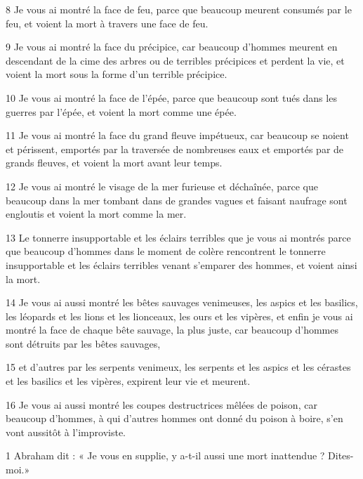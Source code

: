 \par 8 Je vous ai montré la face de feu, parce que beaucoup meurent consumés par le feu, et voient la mort à travers une face de feu.

\par 9 Je vous ai montré la face du précipice, car beaucoup d'hommes meurent en descendant de la cime des arbres ou de terribles précipices et perdent la vie, et voient la mort sous la forme d'un terrible précipice.

\par 10 Je vous ai montré la face de l'épée, parce que beaucoup sont tués dans les guerres par l'épée, et voient la mort comme une épée.

\par 11 Je vous ai montré la face du grand fleuve impétueux, car beaucoup se noient et périssent, emportés par la traversée de nombreuses eaux et emportés par de grands fleuves, et voient la mort avant leur temps.

\par 12 Je vous ai montré le visage de la mer furieuse et déchaînée, parce que beaucoup dans la mer tombant dans de grandes vagues et faisant naufrage sont engloutis et voient la mort comme la mer.

\par 13 Le tonnerre insupportable et les éclairs terribles que je vous ai montrés parce que beaucoup d'hommes dans le moment de colère rencontrent le tonnerre insupportable et les éclairs terribles venant s'emparer des hommes, et voient ainsi la mort.

\par 14 Je vous ai aussi montré les bêtes sauvages venimeuses, les aspics et les basilics, les léopards et les lions et les lionceaux, les ours et les vipères, et enfin je vous ai montré la face de chaque bête sauvage, la plus juste, car beaucoup d'hommes sont détruits par les bêtes sauvages,

\par 15 et d'autres par les serpents venimeux, les serpents et les aspics et les cérastes et les basilics et les vipères, expirent leur vie et meurent.

\par 16 Je vous ai aussi montré les coupes destructrices mêlées de poison, car beaucoup d'hommes, à qui d'autres hommes ont donné du poison à boire, s'en vont aussitôt à l'improviste.


\par 1 Abraham dit : « Je vous en supplie, y a-t-il aussi une mort inattendue ? Dites-moi.»

